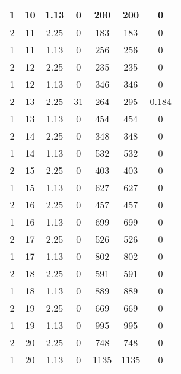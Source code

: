 \documentclass[letterpaper, 12pt]{article}
\begin{document}
\begin{longtable}{|c|c|c|c|c|c|c|}
\hline
1 & 10 & 1.13 & 0 & 200 & 200 & 0 \\
\hline
2 & 11 & 2.25 & 0 & 183 & 183 & 0 \\
\hline
1 & 11 & 1.13 & 0 & 256 & 256 & 0 \\
\hline
2 & 12 & 2.25 & 0 & 235 & 235 & 0 \\
\hline
1 & 12 & 1.13 & 0 & 346 & 346 & 0 \\
\hline
2 & 13 & 2.25 & 31 & 264 & 295 & 0.184 \\
\hline
1 & 13 & 1.13 & 0 & 454 & 454 & 0 \\
\hline
2 & 14 & 2.25 & 0 & 348 & 348 & 0 \\
\hline
1 & 14 & 1.13 & 0 & 532 & 532 & 0 \\
\hline
2 & 15 & 2.25 & 0 & 403 & 403 & 0 \\
\hline
1 & 15 & 1.13 & 0 & 627 & 627 & 0 \\
\hline
2 & 16 & 2.25 & 0 & 457 & 457 & 0 \\
\hline
1 & 16 & 1.13 & 0 & 699 & 699 & 0 \\
\hline
2 & 17 & 2.25 & 0 & 526 & 526 & 0 \\
\hline
1 & 17 & 1.13 & 0 & 802 & 802 & 0 \\
\hline
2 & 18 & 2.25 & 0 & 591 & 591 & 0 \\
\hline
1 & 18 & 1.13 & 0 & 889 & 889 & 0 \\
\hline
2 & 19 & 2.25 & 0 & 669 & 669 & 0 \\
\hline
1 & 19 & 1.13 & 0 & 995 & 995 & 0 \\
\hline
2 & 20 & 2.25 & 0 & 748 & 748 & 0 \\
\hline
1 & 20 & 1.13 & 0 & 1135 & 1135 & 0 \\
\hline
\end{longtable}
\end{document}
